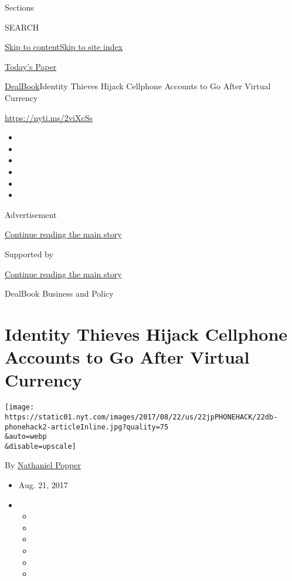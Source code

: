 Sections

SEARCH

\protect\hyperlink{site-content}{Skip to
content}\protect\hyperlink{site-index}{Skip to site index}

\href{https://myaccount.nytimes.com/auth/login?response_type=cookie\&client_id=vi}{}

\href{https://www.nytimes.com/section/todayspaper}{Today's Paper}

\href{/section/business/dealbook}{DealBook}\textbar{}Identity Thieves
Hijack Cellphone Accounts to Go After Virtual Currency

\url{https://nyti.ms/2viXcSs}

\begin{itemize}
\item
\item
\item
\item
\item
\item
\end{itemize}

Advertisement

\protect\hyperlink{after-top}{Continue reading the main story}

Supported by

\protect\hyperlink{after-sponsor}{Continue reading the main story}

DealBook Business and Policy

\hypertarget{identity-thieves-hijack-cellphone-accounts-to-go-after-virtual-currency}{%
\section{Identity Thieves Hijack Cellphone Accounts to Go After Virtual
Currency}\label{identity-thieves-hijack-cellphone-accounts-to-go-after-virtual-currency}}

\texttt{[image: https://static01.nyt.com/images/2017/08/22/us/22jpPHONEHACK/22db-phonehack2-articleInline.jpg?quality=75\\\&auto=webp\\\&disable=upscale]}

By \href{http://www.nytimes.com/by/nathaniel-popper}{Nathaniel Popper}

\begin{itemize}
\item
  Aug. 21, 2017
\item
  \begin{itemize}
  \item
  \item
  \item
  \item
  \item
  \item
  \end{itemize}
\end{itemize}

